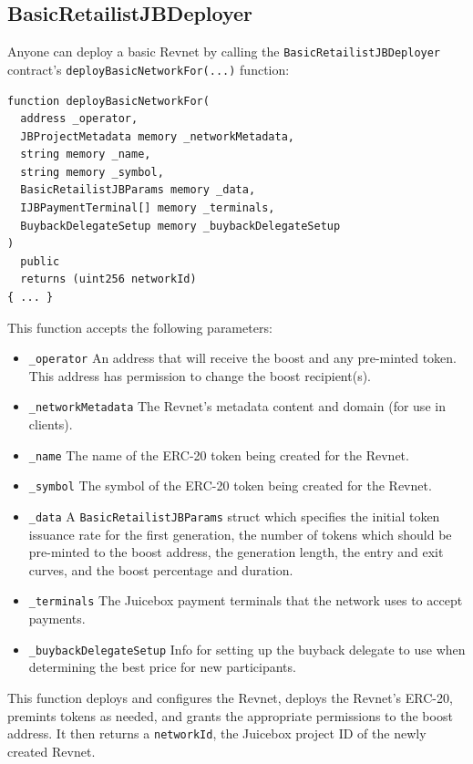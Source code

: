 \documentclass{article}
\begin{document}
\subsection{BasicRetailistJBDeployer}

Anyone can deploy a basic Revnet by calling the \texttt{BasicRetailistJBDeployer} contract's \texttt{deployBasicNetworkFor(...)} function:

\begin{lstlisting}[language=Solidity]
function deployBasicNetworkFor(
  address _operator,
  JBProjectMetadata memory _networkMetadata,
  string memory _name,
  string memory _symbol,
  BasicRetailistJBParams memory _data,
  IJBPaymentTerminal[] memory _terminals,
  BuybackDelegateSetup memory _buybackDelegateSetup
)
  public
  returns (uint256 networkId)
{ ... }
\end{lstlisting}

This function accepts the following parameters:

\begin{itemize}
  \item \texttt{\_operator} An address that will receive the boost and any pre-minted token. This address has permission to change the boost recipient(s).
  \item \texttt{\_networkMetadata} The Revnet's metadata content and domain (for use in clients).
  \item \texttt{\_name} The name of the ERC-20 token being created for the Revnet.
  \item \texttt{\_symbol} The symbol of the ERC-20 token being created for the Revnet.
  \item \texttt{\_data} A \texttt{BasicRetailistJBParams} struct which specifies the initial token issuance rate for the first generation, the number of tokens which should be pre-minted to the boost address, the generation length, the entry and exit curves, and the boost percentage and duration.
  \item \texttt{\_terminals} The Juicebox payment terminals that the network uses to accept payments.
  \item \texttt{\_buybackDelegateSetup} Info for setting up the buyback delegate to use when determining the best price for new participants.
\end{itemize}

This function deploys and configures the Revnet, deploys the Revnet's ERC-20, premints tokens as needed, and grants the appropriate permissions to the boost address. It then returns a \texttt{networkId}, the Juicebox project ID of the newly created Revnet.
\end{document}
